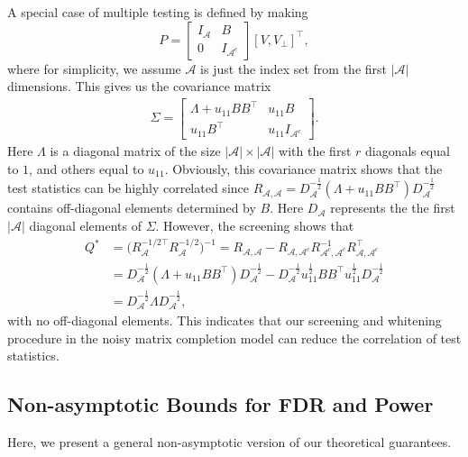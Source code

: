 \documentclass[12pt]{article}
\newcommand{\abs}[1]{\left\lvert#1\right\rvert}
\def\calA{{\mathcal A}}
\theoremstyle{plain}
\begin{document}
A special case of  multiple testing is defined by making 
\begin{equation*}
    P=\left[\begin{matrix} I_{\calA} & B \\0 & I_{\calA^{c} }
        \end{matrix}\right]\left[V, V_\perp\right]^{\top},
\end{equation*}
where for simplicity, we assume $\calA$ is just the index set from the first $\abs{\calA}$ dimensions. This gives us the covariance matrix
\begin{equation*}
\begin{aligned}
        \Sigma = \left[\begin{matrix} \Lambda +u_{11} BB^\top & u_{11}B \\u_{11}B^\top & u_{11} I_{\calA^{c} }
        \end{matrix}\right].
\end{aligned}
\end{equation*}
Here $\Lambda$ is a diagonal matrix of the size $\abs{\calA}\times\abs{\calA}$  with the first $r$ diagonals equal to $1$, and others equal to $u_{11}$.
Obviously, this covariance matrix shows that the test statistics can be highly correlated since $R_{\calA,\calA} = D_{\calA}^{-\frac{1}{2}}\left( \Lambda +u_{11} BB^\top \right)D_{\calA}^{-\frac{1}{2}}  $ contains off-diagonal elements determined by $B$. Here $D_{\calA}$ represents the the first $\abs{\calA}$ diagonal elements of $\Sigma$. However, the screening shows that
\begin{equation*}
\begin{aligned}
        Q^{\ast}&=\big(R_{\calA}^{-1/2\top} R_{\calA}^{-1/2}\big)^{-1}=R_{\calA,\calA} - R_{\calA,\calA^c}R_{\calA^c,\calA^c}^{-1}R_{\calA,\calA^c}^\top \\
        &=  D_{\calA}^{-\frac{1}{2}}\left( \Lambda +u_{11} BB^\top \right)D_{\calA}^{-\frac{1}{2}} -   D_{\calA}^{-\frac{1}{2}}  u_{11}^{\frac{1}{2}} B B^\top  u_{11}^{\frac{1}{2}} D_{\calA}^{-\frac{1}{2}} \\
        & =  D_{\calA}^{-\frac{1}{2}} \Lambda D_{\calA}^{-\frac{1}{2}},
\end{aligned}
\end{equation*}
with no off-diagonal elements. This indicates that our screening and whitening procedure in the noisy matrix completion model can reduce the correlation of test statistics.

\subsection{Non-asymptotic Bounds for FDR and Power}
Here, we present a general non-asymptotic version of our theoretical guarantees.
\end{document}
